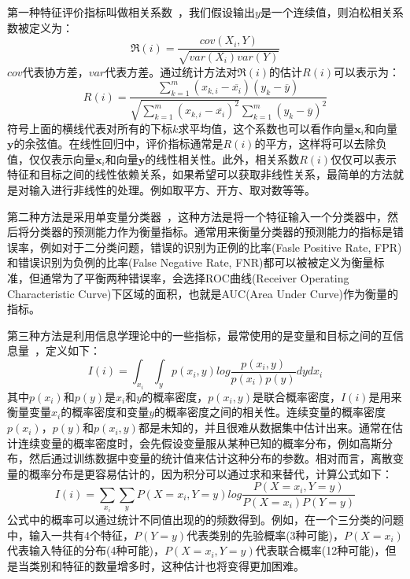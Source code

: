 第一种特征评价指标叫做相关系数~\cite{Weston2003Use}，我们假设输出$y$是一个连续值，则泊松相关系数被定义为：
\begin{equation}
\label{equ:pearson_cc}
    \Re(i) = \frac{cov(X_i, Y)}{\sqrt{var(X_i)var(Y)}}
\end{equation}
$cov$代表协方差，$var$代表方差。通过统计方法对$\Re(i)$的估计$R(i)$可以表示为：
\begin{equation}
\label{equ:pearson_cc_real}
    R(i) = \frac{\sum_{k=1}^{m}(x_{k,i} - \overline{x_i})(y_k - \overline{y})}{\sqrt{\sum_{k=1}^{m}(x_{k,i} - \overline{x_i})^2}\sum_{k=1}^{m}(y_k - \overline{y})^2}
\end{equation}
符号上面的横线代表对所有的下标$k$求平均值，这个系数也可以看作向量$\mathbf{x}_i$和向量$\mathbf{y}$的余弦值。在线性回归中，评价指标通常是$R(i)$的平方，这样将可以去除负值，仅仅表示向量$\mathbf{x}_i$和向量$\mathbf{y}$的线性相关性。此外，相关系数$R(i)$仅仅可以表示特征和目标之间的线性依赖关系，如果希望可以获取非线性关系，最简单的方法就是对输入进行非线性的处理。例如取平方、开方、取对数等等。

第二种方法是采用单变量分类器~\cite{Forman2003An}，这种方法是将一个特征输入一个分类器中，然后将分类器的预测能力作为衡量指标。通常用来衡量分类器的预测能力的指标是错误率，例如对于二分类问题，错误的识别为正例的比率(Fasle Positive Rate, FPR)和错误识别为负例的比率(False Negative Rate, FNR)都可以被被定义为衡量标准，但通常为了平衡两种错误率，会选择ROC曲线(Receiver Operating Characteristic Curve)下区域的面积，也就是AUC(Area Under Curve)作为衡量的指标。

第三种方法是利用信息学理论中的一些指标，最常使用的是变量和目标之间的互信息量~\cite{Forman2003An, Bekkerman2003Distributional}，定义如下：
\begin{equation}
\label{equ:mutual_info}
    I(i) = \int_{x_i}\int_{y}p(x_i, y)log\frac{p(x_i, y)}{p(x_i)p(y)}dydx_i
\end{equation}
其中$p(x_i)$和$p(y)$是$x_i$和$y$的概率密度，$p(x_i, y)$是联合概率密度，$I(i)$是用来衡量变量$x_i$的概率密度和变量$y$的概率密度之间的相关性。连续变量的概率密度$p(x_i)$，$p(y)$和$p(x_i, y)$都是未知的，并且很难从数据集中估计出来。通常在估计连续变量的概率密度时，会先假设变量服从某种已知的概率分布，例如高斯分布，然后通过训练数据中变量的统计值来估计这种分布的参数。相对而言，离散变量的概率分布是更容易估计的，因为积分可以通过求和来替代，计算公式如下：
\begin{equation}
\label{equ:mutual_info_discrete}
    I(i) = \sum_{x_i}\sum_{y}P(X=x_i, Y=y)log\frac{P(X=x_i, Y=y)}{P(X=x_i)P(Y=y)}
\end{equation}
公式中的概率可以通过统计不同值出现的的频数得到。例如，在一个三分类的问题中，输入一共有4个特征，$P(Y=y)$代表类别的先验概率(3种可能)，$P(X=x_i)$代表输入特征的分布(4种可能)，$P(X=x_i, Y=y)$代表联合概率(12种可能)，但是当类别和特征的数量增多时，这种估计也将变得更加困难。

